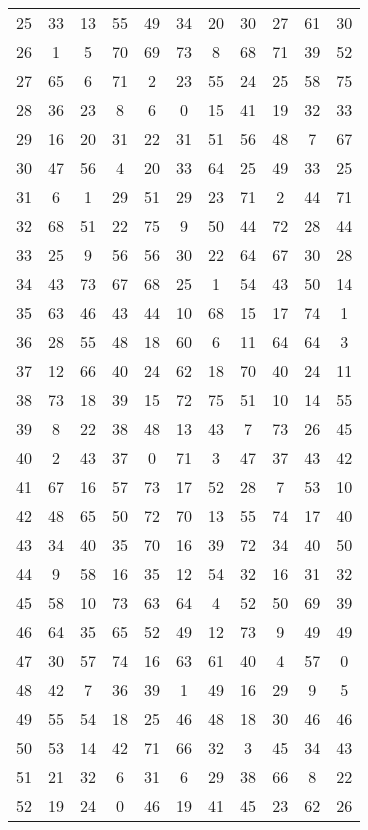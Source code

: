 \begin{table}
\begin{tabular}{c c c c c c c c c c c }
25 & 33 & 13 & 55 & 49 & 34 & 20 & 30 & 27 & 61 & 30 \\
26 & 1 & 5 & 70 & 69 & 73 & 8 & 68 & 71 & 39 & 52 \\
27 & 65 & 6 & 71 & 2 & 23 & 55 & 24 & 25 & 58 & 75 \\
28 & 36 & 23 & 8 & 6 & 0 & 15 & 41 & 19 & 32 & 33 \\
29 & 16 & 20 & 31 & 22 & 31 & 51 & 56 & 48 & 7 & 67 \\
30 & 47 & 56 & 4 & 20 & 33 & 64 & 25 & 49 & 33 & 25 \\
31 & 6 & 1 & 29 & 51 & 29 & 23 & 71 & 2 & 44 & 71 \\
32 & 68 & 51 & 22 & 75 & 9 & 50 & 44 & 72 & 28 & 44 \\
33 & 25 & 9 & 56 & 56 & 30 & 22 & 64 & 67 & 30 & 28 \\
34 & 43 & 73 & 67 & 68 & 25 & 1 & 54 & 43 & 50 & 14 \\
35 & 63 & 46 & 43 & 44 & 10 & 68 & 15 & 17 & 74 & 1 \\
36 & 28 & 55 & 48 & 18 & 60 & 6 & 11 & 64 & 64 & 3 \\
37 & 12 & 66 & 40 & 24 & 62 & 18 & 70 & 40 & 24 & 11 \\
38 & 73 & 18 & 39 & 15 & 72 & 75 & 51 & 10 & 14 & 55 \\
39 & 8 & 22 & 38 & 48 & 13 & 43 & 7 & 73 & 26 & 45 \\
40 & 2 & 43 & 37 & 0 & 71 & 3 & 47 & 37 & 43 & 42 \\
41 & 67 & 16 & 57 & 73 & 17 & 52 & 28 & 7 & 53 & 10 \\
42 & 48 & 65 & 50 & 72 & 70 & 13 & 55 & 74 & 17 & 40 \\
43 & 34 & 40 & 35 & 70 & 16 & 39 & 72 & 34 & 40 & 50 \\
44 & 9 & 58 & 16 & 35 & 12 & 54 & 32 & 16 & 31 & 32 \\
45 & 58 & 10 & 73 & 63 & 64 & 4 & 52 & 50 & 69 & 39 \\
46 & 64 & 35 & 65 & 52 & 49 & 12 & 73 & 9 & 49 & 49 \\
47 & 30 & 57 & 74 & 16 & 63 & 61 & 40 & 4 & 57 & 0 \\
48 & 42 & 7 & 36 & 39 & 1 & 49 & 16 & 29 & 9 & 5 \\
49 & 55 & 54 & 18 & 25 & 46 & 48 & 18 & 30 & 46 & 46 \\
50 & 53 & 14 & 42 & 71 & 66 & 32 & 3 & 45 & 34 & 43 \\
51 & 21 & 32 & 6 & 31 & 6 & 29 & 38 & 66 & 8 & 22 \\
52 & 19 & 24 & 0 & 46 & 19 & 41 & 45 & 23 & 62 & 26 \\

\end{tabular}
\end{table}
